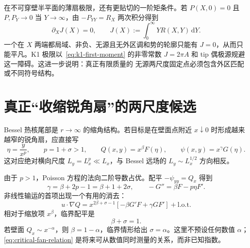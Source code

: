 \documentclass[11pt,a4paper,fontset=fandol]{ctexart}
\newcommand{\dd}{\,\mathrm d}
\newcommand{\grad}{\nabla}
\begin{document}
在不可穿壁半平面的薄扇极限，还有更贴切的一阶矩条件。若
$P(X,0)=0$ 且 $P,P_Y\to0$ 当 $Y\to\infty$，由
$-P_{YY}=R_X$ 两次积分得到
\begin{equation}
  \partial_X J(X)=0,\qquad
  J(X):=\int_0^\infty YR(X,Y)\dd Y.
  \label{eq:first-moment-constraint}
\end{equation}
一个在 $X$ 两端都局域、非负、无源且无外区调和势的轮廓只能有
$J=0$，从而只能平凡。K1 极限以~\eqref{eq:k1-first-moment} 的非零常数
$J=2\pi A$ 和 tip 偶极源规避这一障碍。这进一步说明：真正有限质量的
无源两尺度固定点必须包含外区匹配或不同符号结构。

\section{真正“收缩锐角扇”的两尺度候选}

Bessel 热核尾部是 $r\to\infty$ 的缩角结构。若目标是在壁面点附近
$x\downarrow0$ 时形成越来越窄的锐角扇，应直接写
\begin{equation}
  \eta=\frac{y}{x^p},\qquad p=1+\sigma>1,
  \qquad
  Q(x,y)=x^\beta F(\eta),
  \qquad
  \psi(x,y)=x^\gamma G(\eta).
  \label{eq:shrinking-fan}
\end{equation}
这对应绝对横向尺度 $L_y=L_x^p\ll L_x$，与 Bessel 远场的
$L_y\sim L_x^{1/2}$ 方向相反。

由于 $p>1$，Poisson 方程的法向二阶导数占优。配平
$-\psi_{yy}=Q_x$ 得到
\begin{equation}
  \gamma=\beta+2p-1=\beta+1+2\sigma,
  \qquad
  -G''=\beta F-p\eta F'.
  \label{eq:shrinking-poisson}
\end{equation}
非线性输运的首项出现一个有用的消去：
\begin{equation}
  u\cdot\grad Q
  =x^{2\beta+\sigma-1}
  \left[-\beta G'F+\gamma GF'\right]+\mathrm{l.o.t.}
  \label{eq:shrinking-transport}
\end{equation}
相对于缩放项 $x^\beta$，临界配平是
\begin{equation}
  \beta+\sigma=1.
  \label{eq:critical-fan-relation}
\end{equation}
若壁面 $Q_x\sim x^{-\alpha}$，则 $\beta=1-\alpha$，临界情形给出
$\sigma=\alpha$。这里不预设任何数值 $\alpha$；
\eqref{eq:critical-fan-relation} 是将来可从数值同时测量的关系，而非已知指数。
\end{document}
